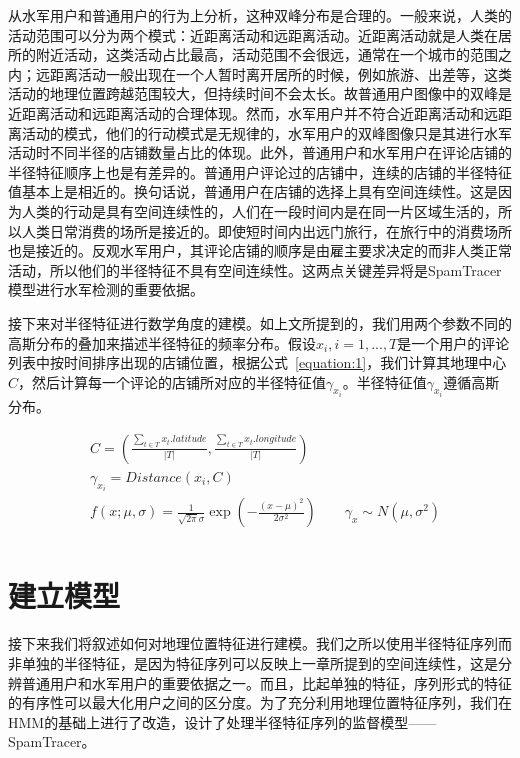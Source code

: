 从水军用户和普通用户的行为上分析，这种双峰分布是合理的。一般来说，人类的活动范围可以分为两个模式：近距离活动和远距离活动。近距离活动就是人类在居所的附近活动，这类活动占比最高，活动范围不会很远，通常在一个城市的范围之内；远距离活动一般出现在一个人暂时离开居所的时候，例如旅游、出差等，这类活动的地理位置跨越范围较大，但持续时间不会太长。故普通用户图像中的双峰是近距离活动和远距离活动的合理体现。然而，水军用户并不符合近距离活动和远距离活动的模式，他们的行动模式是无规律的，水军用户的双峰图像只是其进行水军活动时不同半径的店铺数量占比的体现。此外，普通用户和水军用户在评论店铺的半径特征顺序上也是有差异的。普通用户评论过的店铺中，连续的店铺的半径特征值基本上是相近的。换句话说，普通用户在店铺的选择上具有空间连续性。这是因为人类的行动是具有空间连续性的，人们在一段时间内是在同一片区域生活的，所以人类日常消费的场所是接近的。即使短时间内出远门旅行，在旅行中的消费场所也是接近的。反观水军用户，其评论店铺的顺序是由雇主要求决定的而非人类正常活动，所以他们的半径特征不具有空间连续性。这两点关键差异将是SpamTracer模型进行水军检测的重要依据。

接下来对半径特征进行数学角度的建模。如上文所提到的，我们用两个参数不同的高斯分布的叠加来描述半径特征的频率分布。假设$x_i, i = 1,...,T$是一个用户的评论列表中按时间排序出现的店铺位置，根据公式~\eqref{equation:1}，我们计算其地理中心$C$，然后计算每一个评论的店铺所对应的半径特征值$\gamma_{x_i}$。半径特征值$\gamma_{x_i}$遵循高斯分布。


\begin{equation}
\label{equation:1}
\begin{aligned}
& C = (\frac{\sum_{t \in T}{x_t.latitude}}{|T|}, \frac{\sum_{t \in T}{x_t.longitude}}{|T|})\\
& \gamma_{x_i} = Distance(x_i, C)\\
& f(x;\mu, \sigma) = \frac{1}{\sqrt{2\pi}\sigma}\exp{(-\frac{(x-\mu)^2}{2\sigma^2})} \qquad
\gamma_{x}\sim N(\mu, \sigma^2) \\
\end{aligned}
\end{equation}




\section{建立模型}

接下来我们将叙述如何对地理位置特征进行建模。我们之所以使用半径特征序列而非单独的半径特征，是因为特征序列可以反映上一章所提到的空间连续性，这是分辨普通用户和水军用户的重要依据之一。而且，比起单独的特征，序列形式的特征的有序性可以最大化用户之间的区分度。为了充分利用地理位置特征序列，我们在HMM的基础上进行了改造，设计了处理半径特征序列的监督模型——SpamTracer。

